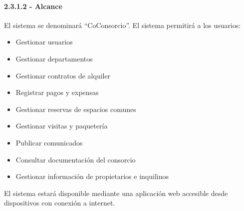 \paragraph{2.3.1.2 - Alcance}

El sistema se denominará ``CoConsorcio''.  
El sistema permitirá a los usuarios:
\begin{itemize}
    \item Gestionar usuarios   
    \item Gestionar departamentos   
    \item Gestionar contratos de alquiler   
    \item Registrar pagos y expensas   
    \item Gestionar reservas de espacios comunes   
    \item Gestionar visitas y paquetería   
    \item Publicar comunicados   
    \item Consultar documentación del consorcio   
    \item Gestionar información de propietarios e inquilinos 
\end{itemize}

El sistema estará disponible mediante una aplicación web accesible desde dispositivos con conexión a internet.
